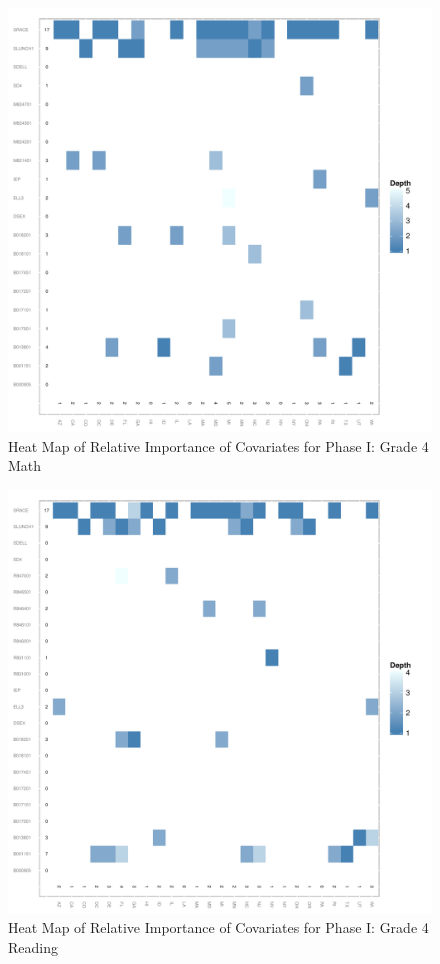\documentclass[letterpaper,12p,twoside]{article} %
\begin{document}
{\begin{figure}[h]
\begin{center}
\includegraphics[width=\textwidth]{../Figures2009/g4math-mlpsa-ctree-heat.pdf}
\caption{Heat Map of Relative Importance of Covariates for Phase I: Grade 4 Math}
\label{fig:g4math-mlpsa-ctree-heat}
\end{center}
\end{figure}

\begin{figure}[h]
\begin{center}
\includegraphics[width=\textwidth]{../Figures2009/g4read-mlpsa-ctree-heat.pdf}
\caption{Heat Map of Relative Importance of Covariates for Phase I: Grade 4 Reading}
\label{fig:g4read-mlpsa-ctree-heat}
\end{center}
\end{figure}

}
\end{document}
